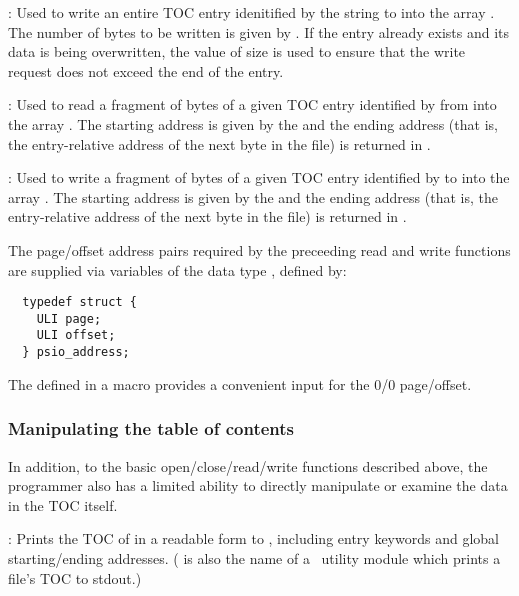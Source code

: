 : Used to write an entire TOC entry idenitified by the string
 to  into the array . The number
of bytes to be written is given by . If the entry already
exists and its data is being overwritten, the value of size is used to
ensure that the write request does not exceed the end of the entry.

: Used to read a fragment of
 bytes of a given TOC entry identified by  from
 into the array . The starting address is
given by the  and the ending address (that is, the
entry-relative address of the next byte in the file) is returned in
.

: Used to write a fragment of
 bytes of a given TOC entry identified by  to
 into the array . The starting address is
given by the  and the ending address (that is, the
entry-relative address of the next byte in the file) is returned in
.

The page/offset address pairs required by the preceeding read and
write functions are supplied via variables of the data type
, defined by:
\begin{verbatim}
  typedef struct {
    ULI page;
    ULI offset;
  } psio_address;
\end{verbatim}
The  defined in a macro provides a convenient input
for the 0/0 page/offset.

\subsubsection{Manipulating the table of contents}
In addition, to the basic open/close/read/write functions described above,
the programmer also has a limited ability to directly manipulate or examine
the data in the TOC itself.

: Prints the TOC of
 in a readable form to , including entry
keywords and global starting/ending addresses.  ( is
also the name of a \PSIthree\ utility module which prints a file's TOC to
stdout.)


